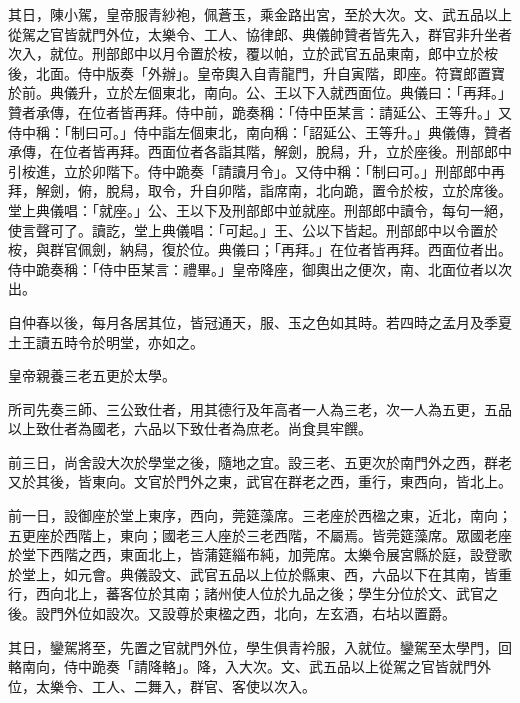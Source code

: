 \begin{pinyinscope}
 其日，陳小駕，皇帝服青紗袍，佩蒼玉，乘金路出宮，至於大次。文、武五品以上從駕之官皆就門外位，太樂令、工人、協律郎、典儀帥贊者皆先入，群官非升坐者次入，就位。刑部郎中以月令置於桉，覆以帕，立於武官五品東南，郎中立於桉後，北面。侍中版奏「外辦」。皇帝輿入自青龍門，升自寅階，即座。符寶郎置寶於前。典儀升，立於左個東北，南向。公、王以下入就西面位。典儀曰：「再拜。」贊者承傳，在位者皆再拜。侍中前，跪奏稱：「侍中臣某言：請延公、王等升。」又侍中稱：「制曰可。」侍中詣左個東北，南向稱：「詔延公、王等升。」典儀傳，贊者承傳，在位者皆再拜。西面位者各詣其階，解劍，脫舄，升，立於座後。刑部郎中引桉進，立於卯階下。侍中跪奏「請讀月令」。又侍中稱：「制曰可。」刑部郎中再拜，解劍，俯，脫舄，取令，升自卯階，詣席南，北向跪，置令於桉，立於席後。堂上典儀唱：「就座。」公、王以下及刑部郎中並就座。刑部郎中讀令，每句一絕，使言聲可了。讀訖，堂上典儀唱：「可起。」王、公以下皆起。刑部郎中以令置於桉，與群官佩劍，納舄，復於位。典儀曰；「再拜。」在位者皆再拜。西面位者出。侍中跪奏稱：「侍中臣某言：禮畢。」皇帝降座，御輿出之便次，南、北面位者以次出。



 自仲春以後，每月各居其位，皆冠通天，服、玉之色如其時。若四時之孟月及季夏土王讀五時令於明堂，亦如之。



 皇帝親養三老五更於太學。



 所司先奏三師、三公致仕者，用其德行及年高者一人為三老，次一人為五更，五品以上致仕者為國老，六品以下致仕者為庶老。尚食具牢饌。



 前三日，尚舍設大次於學堂之後，隨地之宜。設三老、五更次於南門外之西，群老又於其後，皆東向。文官於門外之東，武官在群老之西，重行，東西向，皆北上。



 前一日，設御座於堂上東序，西向，莞筵藻席。三老座於西楹之東，近北，南向；五更座於西階上，東向；國老三人座於三老西階，不屬焉。皆莞筵藻席。眾國老座於堂下西階之西，東面北上，皆蒲筵緇布純，加莞席。太樂令展宮縣於庭，設登歌於堂上，如元會。典儀設文、武官五品以上位於縣東、西，六品以下在其南，皆重行，西向北上，蕃客位於其南；諸州使人位於九品之後；學生分位於文、武官之後。設門外位如設次。又設尊於東楹之西，北向，左玄酒，右坫以置爵。



 其日，鑾駕將至，先置之官就門外位，學生俱青衿服，入就位。鑾駕至太學門，回輅南向，侍中跪奏「請降輅」。降，入大次。文、武五品以上從駕之官皆就門外位，太樂令、工人、二舞入，群官、客使以次入。




\end{pinyinscope}
